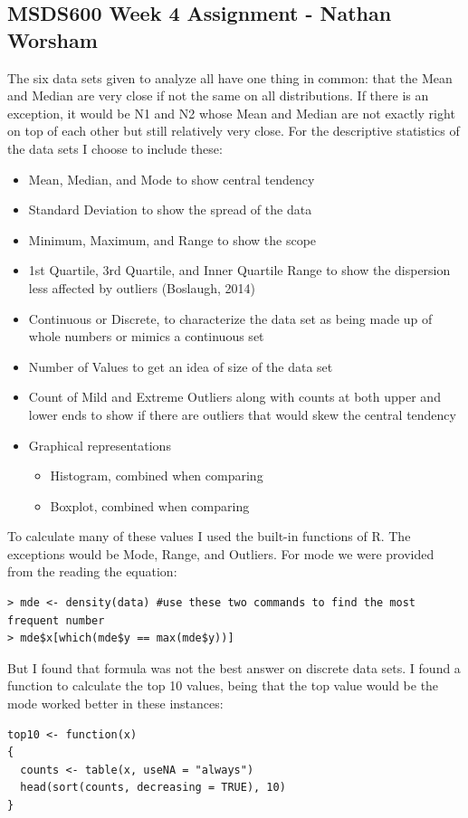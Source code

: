 \documentclass[10pt]{article}
\begin{document}
\subsection*{MSDS600 Week 4 Assignment - Nathan Worsham}
The six data sets given to analyze all have one thing in common: that the Mean and Median are very close if not the same on all distributions. If there is an exception, it would be N1 and N2 whose Mean and Median are not exactly right on top of each other but still relatively very close. For the descriptive statistics of the data sets I choose to include these:
\begin{itemize}
\item Mean, Median, and Mode to show central tendency
\item Standard Deviation to show the spread of the data
\item Minimum, Maximum, and Range to show the scope
\item 1st Quartile, 3rd Quartile, and Inner Quartile Range to show the dispersion less affected by outliers (Boslaugh, 2014)
\item Continuous or Discrete, to characterize the data set as being made up of whole numbers or mimics a continuous set
\item Number of Values to get an idea of size of the data set
\item Count of Mild and Extreme Outliers along with counts at both upper and lower ends to show if there are outliers that would skew the central tendency 
\item Graphical representations\begin{itemize}
	\item Histogram, combined when comparing
	\item Boxplot, combined when comparing
\end{itemize}
\end{itemize}
To calculate many of these values I used the built-in functions of R. The exceptions would be Mode, Range, and Outliers. For mode we were provided from the reading the equation: 
\begin{verbatim}
> mde <- density(data) #use these two commands to find the most frequent number 
> mde$x[which(mde$y == max(mde$y))]
\end{verbatim}
But I found that formula was not the best answer on discrete data sets. I found a function to calculate the top 10 values, being that the top value would be the mode worked better in these instances:
\begin{verbatim}
top10 <- function(x)
{
  counts <- table(x, useNA = "always")
  head(sort(counts, decreasing = TRUE), 10)
}
\end{verbatim}
\end{document}
